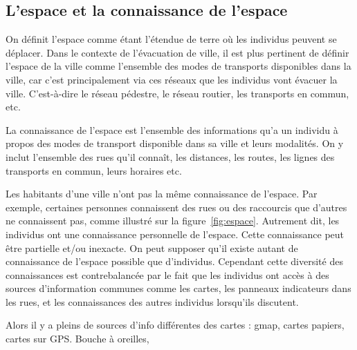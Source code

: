 \documentclass[a4paper]{article}
\begin{document}
\subsection{L'espace et la connaissance de l'espace}

On définit l'espace comme étant l'étendue de terre où les individus peuvent se
déplacer. Dans le contexte de l'évacuation de ville, il est plus pertinent de
définir l'espace de la ville comme l'ensemble des modes de transports
disponibles dans la ville, car c'est principalement via ces réseaux que les
individus vont évacuer la ville. C'est-à-dire le réseau pédestre, le réseau
routier, les transports en commun, etc.

La connaissance de l'espace est l'ensemble des informations qu'a un individu à
propos des modes de transport disponible dans sa ville et leurs modalités.  On y
inclut l'ensemble des rues qu'il connaît, les distances, les routes, les lignes
des transports en commun, leurs horaires etc.

Les habitants d'une ville n'ont pas la même connaissance de l'espace. Par
exemple, certaines personnes connaissent des rues ou des raccourcis que d'autres
ne connaissent pas, comme illustré sur la figure~\ref{fig:espace}. Autrement
dit, les individus ont une connaissance personnelle de l'espace. Cette
connaissance peut être partielle et/ou inexacte. On peut supposer qu'il existe
autant de connaissance de l'espace possible que d'individus. Cependant cette
diversité des connaissances est contrebalancée par le fait que les individus ont
accès à des sources d'information communes comme les cartes, les panneaux
indicateurs dans les rues, et les connaissances des autres individus lorsqu'ils
discutent.

Alors il y a pleins de sources d'info différentes des cartes : gmap, cartes
papiers, cartes sur GPS. Bouche à oreilles,
\end{document}
